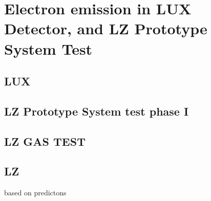 \label{chapter3}
\chapter{Electron emission in LUX Detector, and LZ Prototype System Test}
\section{LUX}

\section{LZ Prototype System test phase I}

\section{LZ GAS TEST}

\section{LZ}
based on predictons

